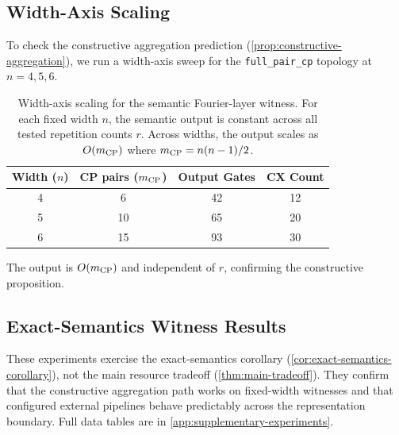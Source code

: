 \documentclass[aps,prx,reprint,floatfix,superscriptaddress]{revtex4-2}
\begin{document}
\subsection{Width-Axis Scaling}

To check the constructive aggregation prediction
(\cref{prop:constructive-aggregation}), we run a width-axis sweep for the
\texttt{full\_pair\_cp} topology at $n = 4, 5, 6$.

\begin{table}[htbp]
\centering
\small
\begin{tabular}{cccc}
\toprule
Width ($n$) & CP pairs ($m_{\rm CP}$) & Output Gates & CX Count \\
\midrule
4 & 6  & 42 & 12 \\
5 & 10 & 65 & 20 \\
6 & 15 & 93 & 30 \\
\bottomrule
\end{tabular}
\caption{Width-axis scaling for the semantic Fourier-layer witness. For
each fixed width $n$, the semantic output is constant across all tested
repetition counts $r$. Across widths, the output scales as $O(m_{\rm CP})$
where $m_{\rm CP} = n(n-1)/2$.}
\label{tab:width-axis-scaling}
\end{table}

The output is $O(m_{\rm CP})$ and independent of $r$, confirming the
constructive proposition.

\subsection{Exact-Semantics Witness Results}

These experiments exercise the exact-semantics corollary
(\cref{cor:exact-semantics-corollary}), not the main resource tradeoff
(\cref{thm:main-tradeoff}). They confirm that the constructive
aggregation path works on fixed-width witnesses and that configured
external pipelines behave predictably across the representation
boundary. Full data tables are in \cref{app:supplementary-experiments}.
\end{document}
